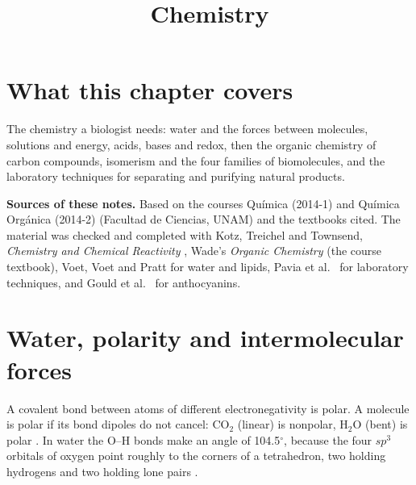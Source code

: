 



\title{Chemistry}
\maketitle

\label{section-phantom}

\tableofcontents

\section{What this chapter covers}
\label{section-chem-overview}

The chemistry a biologist needs: water and
the forces between molecules, solutions and
energy, acids, bases and redox, then the
organic chemistry of carbon compounds,
isomerism and the four families of
biomolecules, and the laboratory techniques
for separating and purifying natural
products.

\textbf{Sources of these notes.}
Based on the courses Química (2014-1) and
Química Orgánica (2014-2)
(Facultad de Ciencias, UNAM)
and the textbooks cited. The
material was checked and completed with Kotz,
Treichel and Townsend, \emph{Chemistry and
Chemical Reactivity}
\cite{kotz2012chemistry}, Wade's
\emph{Organic Chemistry}
\cite{wade2013organic} (the course textbook),
Voet, Voet and Pratt
\cite{voet2013fundamentals} for water and
lipids, Pavia et al.\
\cite{pavia2002microscale} for laboratory
techniques, and Gould et al.\
\cite{gould2009anthocyanins} for
anthocyanins.

\section{Water, polarity and intermolecular
forces}
\label{section-chem-water}

A covalent bond between atoms of different
electronegativity is polar. A molecule is
polar if its bond dipoles do not cancel:
$\mathrm{CO_2}$ (linear) is nonpolar,
$\mathrm{H_2O}$ (bent) is polar \cite[Section
2-9]{wade2013organic}. In water the O--H
bonds make an angle of 104.5$^\circ$, because
the four $sp^3$ orbitals of oxygen point
roughly to the corners of a tetrahedron, two
holding hydrogens and two holding lone pairs
\cite[Chapter 2]{voet2013fundamentals}.

